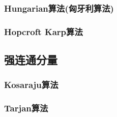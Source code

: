 \subsubsection{Hungarian算法(匈牙利算法)}
\subsubsection{Hopcroft Karp算法}

\subsection{强连通分量}
\subsubsection{Kosaraju算法}
\subsubsection{Tarjan算法}
